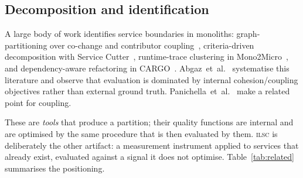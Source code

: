 \documentclass[journal]{IEEEtran}
\newcommand{\ilsc}{\textsc{ilsc}}
\begin{document}
\subsection{Decomposition and identification}
A large body of work identifies service boundaries in monoliths:
graph-partitioning over co-change and contributor
coupling~\cite{mazlami2017extraction}, criteria-driven decomposition with
Service Cutter~\cite{gysel2016service}, runtime-trace clustering in
Mono2Micro~\cite{kalia2021mono2micro}, and dependency-aware
refactoring in CARGO~\cite{nitin2022cargo}. Abgaz~et~al.~\cite{abgaz2023decomposition}
systematise this literature and observe that evaluation is dominated by
internal cohesion/coupling objectives rather than external ground truth.
Panichella~et~al.~\cite{panichella2021structural} make a related point for
coupling.

These are \emph{tools} that produce a partition; their quality functions are
internal and are optimised by the same procedure that is then evaluated by them.
\ilsc{} is deliberately the other artifact: a measurement instrument applied to
services that already exist, evaluated against a signal it does not optimise.
Table~\ref{tab:related} summarises the positioning.
\end{document}
